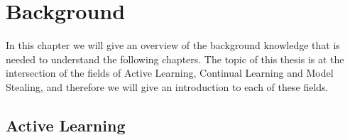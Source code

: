
\chapter{Background}
\label{ch:Background}

In this chapter we will give an overview of the background knowledge that is needed to understand the following chapters. The topic
of this thesis is at the intersection of the fields of Active Learning, Continual Learning and Model Stealing, and therefore we will
give an introduction to each of these fields. 

\section{Active Learning}
\label{sec:ActiveLearning}

